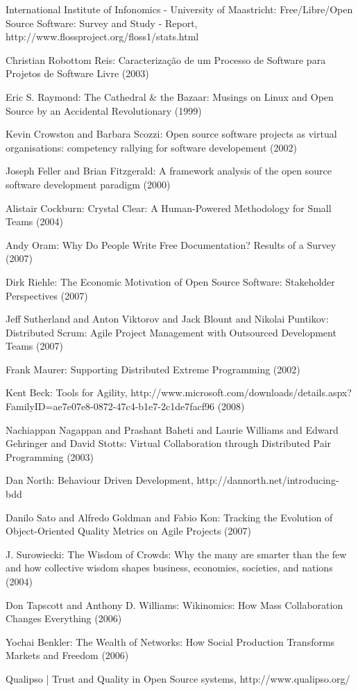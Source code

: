 \documentclass[lnbip]{svmultln}
\begin{document}
\begin{thebibliography}{5}
 International Institute of Infonomics -
  University of Maastricht: Free/Libre/Open Source Software: Survey
  and Study - Report, http://www.flossproject.org/floss1/stats.html

 Christian Robottom Reis: Caracteriza\c{c}\~{a}o de
  um Processo de Software para Projetos de Software Livre (2003)

 Eric S. Raymond: The Cathedral \& the Bazaar:
  Musings on {Linux} and Open Source by an Accidental Revolutionary
  (1999)

 Kevin Crowston and Barbara Scozzi: Open source
  software projects as virtual organisations: competency rallying for
  software developement (2002)

 Joseph Feller and Brian Fitzgerald: A
  framework analysis of the open source software development paradigm
  (2000)

 Alistair Cockburn: Crystal Clear: A
  Human-Powered Methodology for Small Teams (2004)

 Andy Oram: Why Do People Write Free Documentation?
  Results of a Survey (2007)

 Dirk Riehle: The Economic Motivation of Open
  Source Software: Stakeholder Perspectives (2007)

 Jeff Sutherland and Anton Viktorov and Jack
  Blount and Nikolai Puntikov: Distributed Scrum: Agile Project
  Management with Outsourced Development Teams (2007)

 Frank Maurer: Supporting Distributed Extreme
  Programming (2002)

 Kent Beck: Tools for Agility,
  http://www.microsoft.com/downloads/details.aspx?FamilyID=ae7e07e8-0872-47c4-b1e7-2c1de7facf96
  (2008)

 Nachiappan Nagappan and Prashant Baheti and
  Laurie Williams and Edward Gehringer and David Stotts: Virtual
  Collaboration through Distributed Pair Programming (2003)

 Dan North: Behaviour Driven Development,
  http://dannorth.net/introducing-bdd

 Danilo Sato and Alfredo Goldman and Fabio Kon:
  Tracking the Evolution of Object-Oriented Quality Metrics on Agile
  Projects (2007)

 J. Surowiecki: The Wisdom of Crowds: Why the
  many are smarter than the few and how collective wisdom shapes
  business, economies, societies, and nations (2004)

 Don Tapscott and Anthony D. Williams:
  Wikinomics: How Mass Collaboration Changes Everything (2006)

 Yochai Benkler: The Wealth of Networks: How
  Social Production Transforms Markets and Freedom (2006)

 Qualipso | Trust and Quality in Open Source
  systems, http://www.qualipso.org/

\end{thebibliography}
\end{document}

